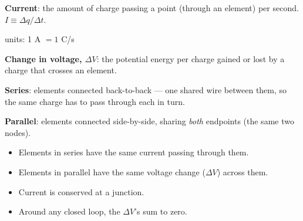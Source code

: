 \documentclass[12pt]{article}
\newcommand{\ANS}[1]{\textcolor{accent}{#1}}
\begin{document}



\textbf{Current}: \ANS{the amount of charge passing a point (through an
element) per second.} \quad $I\equiv\Delta q/\Delta t$.

\hspace{1cm} units: \ANS{1 A $= 1$ C/s}

\textbf{Change in voltage, $\Delta V$}: \ANS{the potential energy per
charge gained or lost by a charge that crosses an element.}

\vspace{2mm}
\textbf{Series}: elements connected \ANS{back-to-back --- one shared wire
between them, so the same charge has to pass through each in turn.}

\textbf{Parallel}: elements connected \ANS{side-by-side, sharing \emph{both}
endpoints (the same two nodes).}


\begin{itemize}[itemsep=7pt,parsep=3pt,topsep=3pt]
\item Elements in series have \ANS{the same current passing through them.}
\item Elements in parallel have \ANS{the same voltage change ($\Delta V$)
across them.}
\item Current is \ANS{conserved} at a junction.
\item Around any closed loop, the $\Delta V$'s \ANS{sum to zero.}
\end{itemize}
\end{document}
